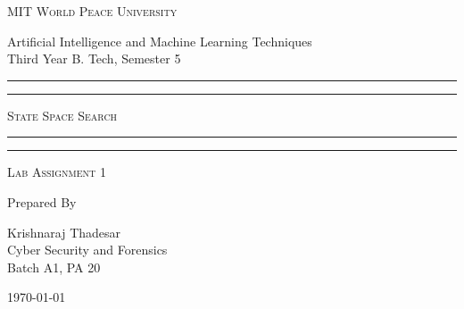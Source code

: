 \documentclass[11pt]{article}
\begin{document}
\begin{titlepage}
    \centering


    \huge\textsc{
        MIT World Peace University
    }\\

    \vspace{0.75\baselineskip} %

    \LARGE{
        Artificial Intelligence and Machine Learning Techniques\\
        Third Year B. Tech, Semester 5
    }

    \vfill %


    \rule{\textwidth}{1.6pt}\vspace*{-\baselineskip}\vspace*{2pt}
    \rule{\textwidth}{0.6pt}
    \vspace{0.75\baselineskip} %



    \huge{\textsc{
            State Space Search
        }} \\



    \vspace{0.5\baselineskip} %
    \rule{\textwidth}{0.6pt}\vspace*{-\baselineskip}\vspace*{2.8pt}
    \rule{\textwidth}{1.6pt}

    \vspace{1\baselineskip} %


    \LARGE\textsc{
        Lab Assignment 1
    } %
    \vfill


    Prepared By
    \vspace{0.5\baselineskip} %

    \Large{
        Krishnaraj Thadesar \\
        Cyber Security and Forensics\\
        Batch A1, PA 20
    }


    \vspace{0.5\baselineskip} %
    \today

\end{titlepage}
\end{document}
